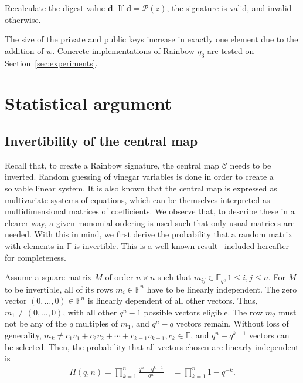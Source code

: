 \documentclass[draft, 12pt, a4paper, oneside]{memoir}
\theoremstyle{definition}
\begin{document}
Recalculate the digest value $\mathbf{d}$. If $\mathbf{d} = \mathcal{P}(z)$,
the signature is valid, and invalid otherwise.

The size of the private and public keys increase in exactly one element due to
the addition of $w$. Concrete implementations of Rainbow-$\eta_{3}$ are tested on
Section~\ref{sec:experiments}.

\section{Statistical argument}

\subsection{Invertibility of the central map}\label{subsec:invert}

Recall that, to create a Rainbow signature, the central map $\mathcal{C}$ needs
to be inverted. Random guessing of vinegar variables is done in order to create
a solvable linear system. It is also known that the central map is expressed as
multivariate systems of equations, which can be themselves interpreted as
multidimensional matrices of coefficients. We observe that, to describe these in a
clearer way, a given monomial ordering is used such that only usual matrices
are needed. With this in mind, we first derive the probability that a random
matrix with elements in $\mathbb{F}$ is invertible. This is a well-known
result~\cite[Remark 13.2.14]{Mullen:2013} included hereafter for completeness.

Assume a square matrix $M$ of order $n \times n$ such that
$m_{ij} \in \mathbb{F}_{q}, 1 \leq i, j \leq n$. For $M$ to be
invertible, all of its rows
$m_{i} \in \mathbb{F}^{n}$ have to be linearly independent. The zero vector
$(0, \dots, 0) \in \mathbb{F}^{n}$ is linearly dependent of all other vectors.
Thus, $m_{1} \neq (0, \dots, 0)$, with all other $q^{n} - 1$ possible vectors
eligible. The row $m_{2}$ must not be any of the $q$ multiples of $m_{1}$, and
$q^{n} - q$ vectors remain. Without loss of generality,
$m_{k} \ne c_{1} v_{1} + c_{2} v_{2} + \cdots + c_{k - 1} v_{k - 1},
c_{k} \in \mathbb{F}$, and $q^{n} - q^{k - 1}$ vectors can be selected. Then,
the probability that all vectors chosen are linearly independent is
\begin{align}
  \Pi(q, n) = \prod_{k = 1}^{n} \frac{q^{n} - q^{k - 1}}{q^{n}} \quad
    = \prod_{k = 1}^{n} 1 - q^{-k}.
\end{align}
\end{document}
